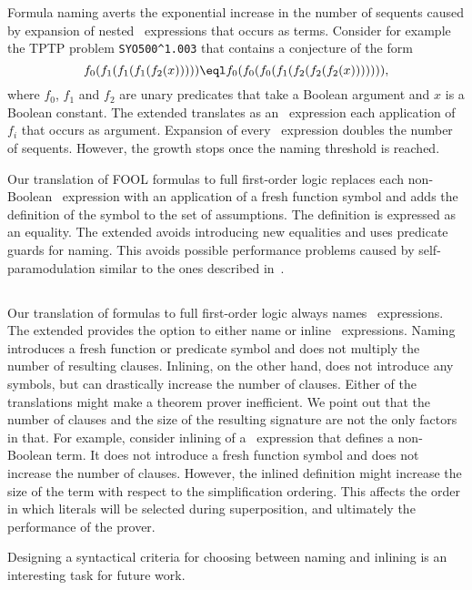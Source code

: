 Formula naming averts the exponential increase in the number of sequents caused by expansion of nested \ITE\ expressions that occurs as terms. Consider for example the TPTP problem \verb'SYO500^1.003' that contains a conjecture of the form $$f_0(f_1(f_1(f_1(f_2(x))))) \eql f_0(f_0(f_0(f_1(f_2(f_2(f_2(x))))))),$$ where $f_0$, $f_1$ and $f_2$ are unary predicates that take a Boolean argument and $x$ is a Boolean constant. The extended \newcnf{} translates as an \ITE\ expression each application of $f_i$ that occurs as argument. Expansion of every \ITE\ expression doubles the number of sequents. However, the growth stops once the naming threshold is reached.

Our translation of FOOL formulas to full first-order logic replaces each non-Boolean \ITE\ expression with an application of a fresh function symbol and adds the definition of the symbol to the set of assumptions. The definition is expressed as an equality. The extended \newcnf{} avoids introducing new equalities and uses predicate guards for naming. This avoids possible performance problems caused by self-paramodulation similar to the ones described in~\cite{FOOL}.

\subsection{\LETIN}
Our translation of \folb{} formulas to full first-order logic always names \LETIN\ expressions. The extended \newcnf{} provides the option to either name or inline \LETIN\ expressions. Naming introduces a fresh function or predicate symbol and does not multiply the number of resulting clauses. Inlining, on the other hand, does not introduce any symbols, but can drastically increase the number of clauses. Either of the translations might make a theorem prover inefficient. We point out that the number of clauses and the size of the resulting signature are not the only factors in that. For example, consider inlining of a \LETIN\ expression that defines a non-Boolean term. It does not introduce a fresh function symbol and does not increase the number of clauses. However, the inlined definition might increase the size of the term with respect to the simplification ordering. This affects the order in which literals will be selected during superposition, and ultimately the performance of the prover.

Designing a syntactical criteria for choosing between naming and inlining is an interesting task for future work.